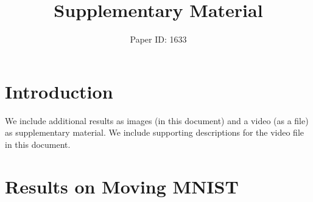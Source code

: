 \documentclass[letterpaper]{article} %
\begin{document}
%
\title{Supplementary Material}
\author{Paper ID: 1633}
\maketitle

\section{Introduction}
We include additional results as images (in this document) and a video (as a file) as supplementary material. We include supporting descriptions for the video file in this document.

\section{Results on Moving MNIST}
\end{document}
